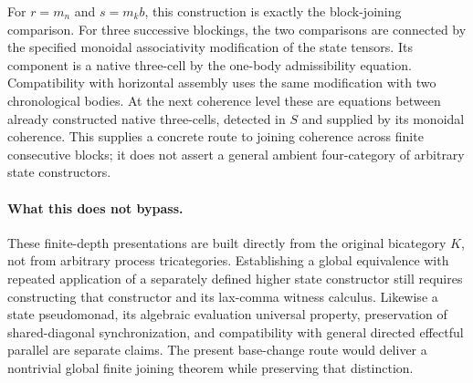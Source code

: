 \documentclass{article}
\begin{document}
For $r=m_n$ and $s=m_kb$, this construction is exactly the block-joining comparison. For three successive blockings, the two comparisons are connected by the specified monoidal associativity modification of the state tensors. Its component is a native three-cell by the one-body admissibility equation. Compatibility with horizontal assembly uses the same modification with two chronological bodies. At the next coherence level these are equations between already constructed native three-cells, detected in $S$ and supplied by its monoidal coherence. This supplies a concrete route to joining coherence across finite consecutive blocks; it does not assert a general ambient four-category of arbitrary state constructors.

\paragraph{What this does not bypass.} These finite-depth presentations are built directly from the original bicategory $K$, not from arbitrary process tricategories. Establishing a global equivalence with repeated application of a separately defined higher state constructor still requires constructing that constructor and its lax-comma witness calculus. Likewise a state pseudomonad, its algebraic evaluation universal property, preservation of shared-diagonal synchronization, and compatibility with general directed effectful parallel are separate claims. The present base-change route would deliver a nontrivial global finite joining theorem while preserving that distinction.
\end{document}
